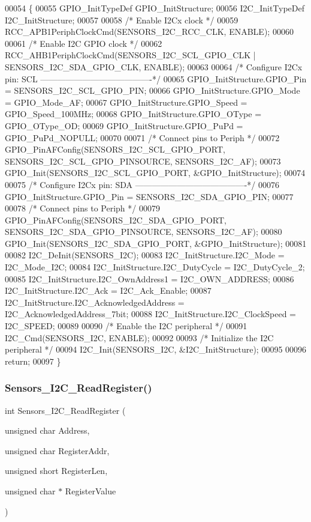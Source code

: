 \begin{DoxyCode}
00054 \{
00055   GPIO_InitTypeDef GPIO\_InitStructure;
00056   I2C_InitTypeDef I2C\_InitStructure;
00057 
00058     \textcolor{comment}{/* Enable I2Cx clock */}
00059   RCC_APB1PeriphClockCmd(SENSORS_I2C_RCC_CLK, ENABLE);
00060 
00061   \textcolor{comment}{/* Enable I2C GPIO clock */}
00062   RCC_AHB1PeriphClockCmd(SENSORS_I2C_SCL_GPIO_CLK | SENSORS_I2C_SDA_GPIO_CLK, 
      ENABLE);
00063 
00064   \textcolor{comment}{/* Configure I2Cx pin: SCL ----------------------------------------*/}
00065   GPIO\_InitStructure.GPIO_Pin =  SENSORS_I2C_SCL_GPIO_PIN; 
00066   GPIO\_InitStructure.GPIO_Mode = GPIO_Mode_AF;
00067   GPIO\_InitStructure.GPIO_Speed = GPIO_Speed_100MHz;
00068   GPIO\_InitStructure.GPIO_OType = GPIO_OType_OD;
00069   GPIO\_InitStructure.GPIO_PuPd  = GPIO_PuPd_NOPULL;
00070 
00071   \textcolor{comment}{/* Connect pins to Periph */}
00072   GPIO_PinAFConfig(SENSORS_I2C_SCL_GPIO_PORT, SENSORS_I2C_SCL_GPIO_PINSOURCE, 
      SENSORS_I2C_AF);  
00073   GPIO_Init(SENSORS_I2C_SCL_GPIO_PORT, &GPIO\_InitStructure);
00074 
00075   \textcolor{comment}{/* Configure I2Cx pin: SDA ----------------------------------------*/}
00076   GPIO\_InitStructure.GPIO_Pin = SENSORS_I2C_SDA_GPIO_PIN; 
00077 
00078   \textcolor{comment}{/* Connect pins to Periph */}
00079   GPIO_PinAFConfig(SENSORS_I2C_SDA_GPIO_PORT, SENSORS_I2C_SDA_GPIO_PINSOURCE, 
      SENSORS_I2C_AF);  
00080   GPIO_Init(SENSORS_I2C_SDA_GPIO_PORT, &GPIO\_InitStructure);  
00081   
00082   I2C_DeInit(SENSORS_I2C);
00083   I2C\_InitStructure.I2C_Mode = I2C_Mode_I2C;
00084   I2C\_InitStructure.I2C_DutyCycle = I2C_DutyCycle_2;
00085   I2C\_InitStructure.I2C_OwnAddress1 = I2C_OWN_ADDRESS;
00086   I2C\_InitStructure.I2C_Ack = I2C_Ack_Enable;
00087   I2C\_InitStructure.I2C_AcknowledgedAddress = I2C_AcknowledgedAddress_7bit;
00088   I2C\_InitStructure.I2C_ClockSpeed = I2C_SPEED;
00089     
00090   \textcolor{comment}{/* Enable the I2C peripheral */}
00091   I2C_Cmd(SENSORS_I2C, ENABLE);  
00092     
00093   \textcolor{comment}{/* Initialize the I2C peripheral */}
00094   I2C_Init(SENSORS_I2C, &I2C\_InitStructure);
00095   
00096   \textcolor{keywordflow}{return};
00097 \}
\end{DoxyCode}
\mbox{\label{i2c_8h_a5cbe0388e76a86986a11311ebb9cee2f}} 
\subsubsection{Sensors\+\_\+\+I2\+C\+\_\+\+Read\+Register()}
{\footnotesize\ttfamily int Sensors\+\_\+\+I2\+C\+\_\+\+Read\+Register (\begin{DoxyParamCaption}\item[{unsigned char}]{Address,  }\item[{unsigned char}]{Register\+Addr,  }\item[{unsigned short}]{Register\+Len,  }\item[{unsigned char $\ast$}]{Register\+Value }\end{DoxyParamCaption})}



